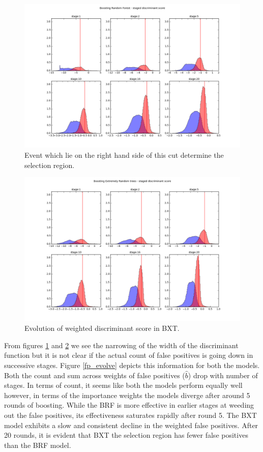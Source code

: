 \begin{figure}
\includegraphics[scale=0.7]{images/brf_staged_bi.png}
\caption[Evolution of weighted discriminant score in BRF.]{Event which lie on the right hand side of this cut determine the selection region.}  
\label{brf_staged_weighted_bi}
\end{figure}

\begin{figure}
\includegraphics[scale=0.7]{images/bxt_staged_bi.png}
\caption{Evolution of weighted discriminant score in BXT.}
\label{bxt_staged_weighted_bi}
\end{figure}

From figures \ref{brf_staged_weighted_bi} and \ref{bxt_staged_weighted_bi} we see the narrowing of the width of the discriminant function but it is not clear if the actual count of false positives is going down in successive stages. Figure \ref{fp_evolve} depicts this information for both the models. Both the count and sum across weights of false positives ($\hat{b}$) drop with number of stages. In terms of count, it seems like both the models perform equally well however, in terms of the importance weights the models diverge after around 5 rounds of boosting. While the BRF is more effective in earlier stages at weeding out the false positives, its effectiveness saturates rapidly after round 5. The BXT model exhibits a slow and consistent decline in the weighted false positives. After 20 rounds, it is evident that BXT the selection region has fewer false positives than the BRF model.   

